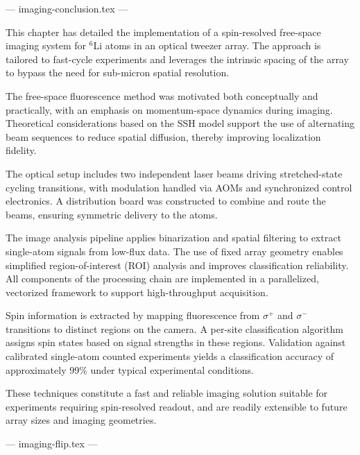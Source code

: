 --- imaging-conclusion.tex ---

This chapter has detailed the implementation of a spin-resolved free-space imaging system for ${}^6$Li atoms in an optical tweezer array. The approach is tailored to fast-cycle experiments and leverages the intrinsic spacing of the array to bypass the need for sub-micron spatial resolution.

The free-space fluorescence method was motivated both conceptually and practically, with an emphasis on momentum-space dynamics during imaging. Theoretical considerations based on the SSH model support the use of alternating beam sequences to reduce spatial diffusion, thereby improving localization fidelity.

The optical setup includes two independent laser beams driving stretched-state cycling transitions, with modulation handled via AOMs and synchronized control electronics. A distribution board was constructed to combine and route the beams, ensuring symmetric delivery to the atoms.

The image analysis pipeline applies binarization and spatial filtering to extract single-atom signals from low-flux data. The use of fixed array geometry enables simplified region-of-interest (ROI) analysis and improves classification reliability. All components of the processing chain are implemented in a parallelized, vectorized framework to support high-throughput acquisition.

Spin information is extracted by mapping fluorescence from $\sigma^+$ and $\sigma^-$ transitions to distinct regions on the camera. A per-site classification algorithm assigns spin states based on signal strengths in these regions. Validation against calibrated single-atom counted experiments yields a classification accuracy of approximately 99\% under typical experimental conditions.

These techniques constitute a fast and reliable imaging solution suitable for experiments requiring spin-resolved readout, and are readily extensible to future array sizes and imaging geometries.


--- imaging-flip.tex ---



